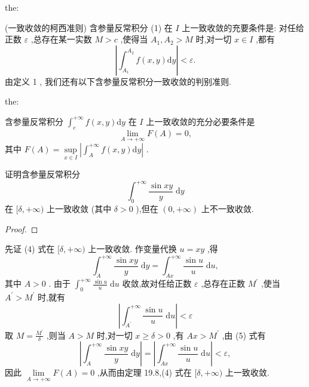 \begin{theorem}{}{the:}

\end{theorem}
(一致收敛的柯西准则) 含参量反常积分 (1) 在 \(I\) 上一致收敛的充要条件是: 对任给正数 \(\varepsilon\) ,总存在某一实数 \(M > c\) ,使得当 \({A}_{1},{A}_{2} > M\) 时,对一切 \(x \in  I\) ,都有
\[
\left| {{\int }_{{A}_{1}}^{{A}_{2}}f\left( {x,y}\right) \mathrm{d}y}\right|  < \varepsilon . \tag{3}
\]
由定义 1 , 我们还有以下含参量反常积分一致收敛的判别准则.

\begin{theorem}{}{the:}

\end{theorem}
 含参量反常积分 \({\int }_{c}^{+\infty }f\left( {x,y}\right) \mathrm{d}y\) 在 \(I\) 上一致收敛的充分必要条件是
\[
\mathop{\lim }\limits_{{A \rightarrow   + \infty }}F\left( A\right)  = 0,
\]
其中 \(F\left( A\right)  = \mathop{\sup }\limits_{{x \in  I}}\left| {{\int }_{A}^{+\infty }f\left( {x,y}\right) \mathrm{d}y}\right|\) .

\begin{example}

\end{example}
证明含参量反常积分
\[
{\int }_{0}^{+\infty }\frac{\sin {xy}}{y}\mathrm{\;d}y \tag{4}
\]
在 \(\lbrack \delta , + \infty )\) 上一致收敛 (其中 \(\delta  > 0\) ),但在 \(\left( {0, + \infty }\right)\) 上不一致收敛.

\begin{proof}

\end{proof}
先证 (4) 式在 \(\lbrack \delta , + \infty )\) 上一致收敛. 作变量代换 \(u = {xy}\) ,得
\[
{\int }_{A}^{+\infty }\frac{\sin {xy}}{y}\mathrm{\;d}y = {\int }_{Ax}^{+\infty }\frac{\sin u}{u}\mathrm{\;d}u, \tag{5}
\]
其中 \(A > 0\) . 由于 \({\int }_{0}^{+\infty }\frac{\sin u}{u}\mathrm{\;d}u\) 收敛,故对任给正数 \(\varepsilon\) ,总存在正数 \({M}^{\prime }\) ,使当 \({A}^{\prime } > {M}^{\prime }\) 时,就有
\[
\left| {{\int }_{{A}^{\prime }}^{+\infty }\frac{\sin u}{u}\mathrm{\;d}u}\right|  < \varepsilon
\]
取 \(M = \frac{{M}^{\prime }}{\delta }\) ,则当 \(A > M\) 时,对一切 \(x \geq  \delta  > 0\) ,有 \({Ax} > {M}^{\prime }\) ,由 (5) 式有
\[
\left| {{\int }_{A}^{+\infty }\frac{\sin {xy}}{y}\mathrm{\;d}y}\right|  = \left| {{\int }_{Ax}^{+\infty }\frac{\sin u}{u}\mathrm{\;d}u}\right|  < \varepsilon ,
\]
因此 \(\mathop{\lim }\limits_{{A \rightarrow   + \infty }}F\left( A\right)  = 0\) ,从而由定理 19.8,(4) 式在 \(\lbrack \delta , + \infty )\) 上一致收敛.

